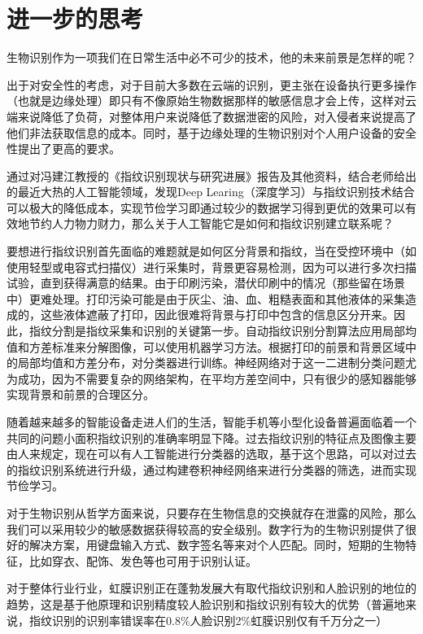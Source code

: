 \documentclass{article}
\begin{document}
\section{进一步的思考}
	生物识别作为一项我们在日常生活中必不可少的技术，他的未来前景是怎样的呢？\par 
	出于对安全性的考虑，对于目前大多数在云端的识别，更主张在设备执行更多操作（也就是边缘处理）即只有不像原始生物数据那样的敏感信息才会上传，这样对云端来说降低了负荷，对整体用户来说降低了数据泄密的风险，对入侵者来说提高了他们非法获取信息的成本。同时，基于边缘处理的生物识别对个人用户设备的安全性提出了更高的要求。\par 
	通过对冯建江教授的《指纹识别现状与研究进展》报告及其他资料，结合老师给出的最近大热的人工智能领域，发现Deep Learing（深度学习）与指纹识别技术结合可以极大的降低成本，实现节俭学习即通过较少的数据学习得到更优的效果可以有效地节约人力物力财力，那么关于人工智能它是如何和指纹识别建立联系呢？\par 
	要想进行指纹识别首先面临的难题就是如何区分背景和指纹，当在受控环境中（如使用轻型或电容式扫描仪）进行采集时，背景更容易检测，因为可以进行多次扫描试验，直到获得满意的结果。由于印刷污染，潜伏印刷中的情况（那些留在场景中）更难处理。打印污染可能是由于灰尘、油、血、粗糙表面和其他液体的采集造成的，这些液体遮蔽了打印，因此很难将背景与打印中包含的信息区分开来。因此，指纹分割是指纹采集和识别的关键第一步。自动指纹识别分割算法应用局部均值和方差标准来分解图像，可以使用机器学习方法。根据打印的前景和背景区域中的局部均值和方差分布，对分类器进行训练。神经网络对于这一二进制分类问题尤为成功，因为不需要复杂的网络架构，在平均方差空间中，只有很少的感知器能够实现背景和前景的合理区分\citep{devidefingerpeint}。\par 

	随着越来越多的智能设备走进人们的生活，智能手机等小型化设备普遍面临着一个共同的问题小面积指纹识别的准确率明显下降\citep{littefingerprint}。过去指纹识别的特征点及图像主要由人来规定，现在可以有人工智能进行分类器的选取，基于这个思路，可以对过去的指纹识别系统进行升级，通过构建卷积神经网络来进行分类器的筛选，进而实现节俭学习。\par 

	对于生物识别从哲学方面来说，只要存在生物信息的交换就存在泄露的风险，那么我们可以采用较少的敏感数据获得较高的安全级别。数字行为的生物识别提供了很好的解决方案，用键盘输入方式、数字签名等来对个人匹配。同时，短期的生物特征，比如穿衣、配饰、发色等也可用于识别认证。\par 
	对于整体行业行业，虹膜识别正在蓬勃发展大有取代指纹识别和人脸识别的地位的趋势，这是基于他原理和识别精度较人脸识别和指纹识别有较大的优势（普遍地来说，指纹识别的识别率错误率在0.8\%人脸识别2\%虹膜识别仅有千万分之一）\par
\end{document}
